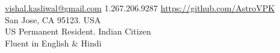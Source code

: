 \documentclass[10pt,a4paper]{article}
\begin{document}
\sloppy  %



\nobreakvspace{0.3em}  %

\noindent\href{mailto:vishal.dot.kasliwal.at.gmail.dot.com}{vishal.kasliwal\mbox{}@\mbox{}gmail.com}\sbull
\textsmaller{+}1.267.206.9287\sbull
\href{https://github.com/AstroVPK}{https://github.com/AstroVPK}
\\
San Jose, CA 95123.\sbull
USA
\\
US Permanent Resident.\sbull
Indian Citizen
\\
Fluent in English \& Hindi
\\
\spacedhrule{0.4em}{0.2em}  %

\end{document}
